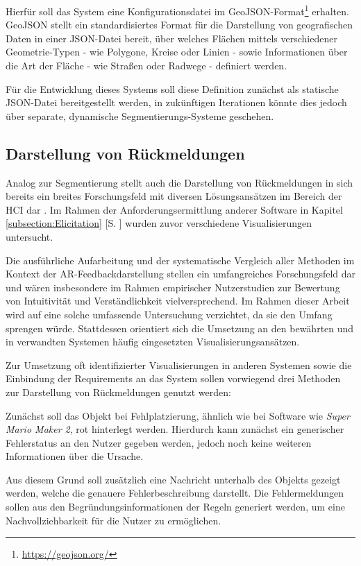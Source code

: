 Hierfür soll das System eine Konfigurationsdatei im GeoJSON-Format\footnote{\url{https://geojson.org/}} erhalten. GeoJSON stellt ein standardisiertes Format für die Darstellung von geografischen Daten in einer JSON-Datei bereit, über welches Flächen mittels verschiedener Geometrie-Typen - wie Polygone, Kreise oder Linien - sowie Informationen über die Art der Fläche - wie Straßen oder  Radwege - definiert werden. \parencite{butlerGeoJSONFormat2016}

Für die Entwicklung dieses Systems soll diese Definition zunächst als statische JSON-Datei bereitgestellt werden, in zukünftigen Iterationen könnte dies jedoch über separate, dynamische Segmentierungs-Systeme geschehen. 

\subsection{Darstellung von Rückmeldungen}

Analog zur Segmentierung stellt auch die Darstellung von Rückmeldungen in sich bereits ein breites Forschungsfeld mit diversen Lösungsansätzen im Bereich der HCI dar \parencite{wangUsingVisualFeedback2023}. Im Rahmen der Anforderungsermittlung anderer Software in Kapitel \ref{subsection:Elicitation} [S. \pageref{subsection:Elicitation}] wurden zuvor verschiedene Visualisierungen untersucht.

Die ausführliche Aufarbeitung und der systematische Vergleich aller Methoden im Kontext der AR-Feedbackdarstellung stellen ein  umfangreiches Forschungsfeld dar und wären insbesondere im Rahmen empirischer Nutzerstudien zur Bewertung von Intuitivität und Verständlichkeit vielversprechend. Im Rahmen dieser Arbeit wird auf eine solche umfassende Untersuchung verzichtet, da sie den Umfang sprengen würde. Stattdessen orientiert sich die Umsetzung an den bewährten und in verwandten Systemen häufig eingesetzten Visualisierungsansätzen.

Zur Umsetzung oft identifizierter Visualisierungen in anderen Systemen sowie die Einbindung der Requirements an das System sollen vorwiegend drei Methoden zur Darstellung von Rückmeldungen genutzt werden:

Zunächst soll das Objekt bei Fehlplatzierung, ähnlich wie bei Software wie \textit{Super Mario Maker 2}, rot hinterlegt werden. Hierdurch kann zunächst ein generischer Fehlerstatus an den Nutzer gegeben werden, jedoch noch keine weiteren Informationen über die Ursache.

Aus diesem Grund soll zusätzlich eine Nachricht unterhalb des Objekts gezeigt werden, welche die genauere Fehlerbeschreibung darstellt. Die Fehlermeldungen sollen aus den Begründungsinformationen der Regeln generiert werden, um eine Nachvollziehbarkeit für die Nutzer zu ermöglichen.

